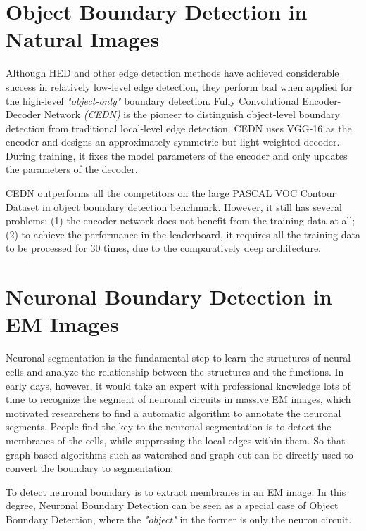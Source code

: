 \documentclass[senior]{IPSstyle}
\begin{document}
\section{Object Boundary Detection in Natural Images}

Although HED\cite{Xie2015} and other edge detection methods\cite{Shen2015, Dollar2013, Arbelaez2011} have achieved considerable success in relatively low-level edge detection, they perform bad when applied for the high-level \emph{"object-only"} boundary detection\cite{Yang2016}. Fully Convolutional Encoder-Decoder Network \emph{(CEDN)}\cite{Yang2016} is the pioneer to distinguish object-level boundary detection from traditional local-level edge detection. CEDN uses VGG-16\cite{Simonyan2014} as the encoder and designs an approximately symmetric but light-weighted decoder. During training, it fixes the model parameters of the encoder and only updates the parameters of the decoder. 

CEDN outperforms all the competitors on the large PASCAL VOC Contour Dataset\cite{Yang2016} in object boundary detection benchmark. However, it still has several problems: 
(1) the encoder network does not benefit from the training data at all; 
(2) to achieve the performance in the leaderboard, it requires all the training data to be processed for 30 times, due to the comparatively deep architecture.

\section{Neuronal Boundary Detection in EM Images}

Neuronal segmentation is the fundamental step to learn the structures of neural cells and analyze the relationship between the structures and the functions\cite{Lichtman2011, Helmstaedter2013, Sporns2005}. In early days, however, it would take an expert with professional knowledge lots of time to recognize the segment of neuronal circuits\cite{Helmstaedter2013} in massive EM images, which motivated researchers to find a automatic algorithm to annotate the neuronal segments. People find the key to the neuronal segmentation is to detect the membranes of the cells, while suppressing the local edges within them\cite{Laptev2012, Kaynig2010, Kumar2010, Seyedhosseini2011}. So that graph-based algorithms such as watershed\cite{Najman1996, Uzunbas2014, Zlateski2015} and graph cut\cite{Boykov2001} can be directly used to convert the boundary to segmentation.

To detect neuronal boundary is to extract membranes in an EM image. In this degree, Neuronal Boundary Detection can be seen as a special case of Object Boundary Detection, where the \emph{"object"} in the former is only the neuron circuit. 
\end{document}
